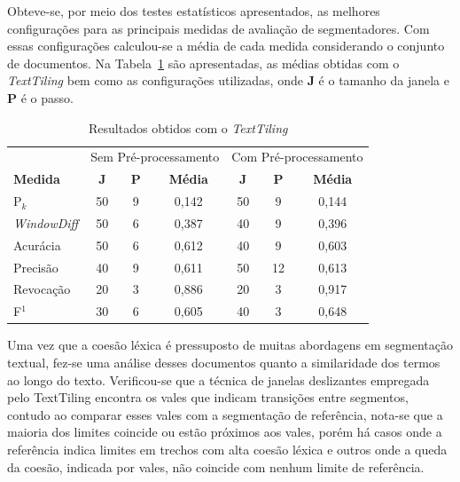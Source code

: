 Obteve-se, por meio dos testes estatísticos apresentados, as melhores configurações para as principais medidas de avaliação de segmentadores. Com essas configurações calculou-se a média de cada medida considerando o conjunto de documentos. Na Tabela~\ref{tab:resultadosTT} são apresentadas, as médias obtidas com o \textit{TextTiling} bem como as configurações utilizadas, onde \textbf{J} é o tamanho da janela e \textbf{P} é o passo.


\begin{table}[!h]
	\centering
	\begin{tabular}{|l||c|c|c||c|c|c|} \hline

		& \multicolumn{3}{c||}{Sem Pré-processamento} 
		& \multicolumn{3}{c|}{Com Pré-processamento}\\			

		\textbf{Medida} & 
		\textbf{J} &
		\textbf{P} & 
		\textbf{Média} &
		\textbf{J} &
		\textbf{P} & 
		\textbf{Média} \\	\hline

		P$_k$				& 50 & 9 & 0,142 & 50 & 9  & 0,144 \\ \hline
		\textit{WindowDiff}	& 50 & 6 & 0,387 & 40 & 9  & 0,396 \\ \hline
		Acurácia			& 50 & 6 & 0,612 & 40 & 9  & 0,603 \\ \hline
		Precisão			& 40 & 9 & 0,611 & 50 & 12 & 0,613 \\ \hline
		Revocação			& 20 & 3 & 0,886 & 20 & 3  & 0,917 \\ \hline
		F$^1$				& 30 & 6 & 0,605 & 40 & 3  & 0,648 \\ \hline

	\end{tabular}
	\caption{Resultados obtidos com o \textit{TextTiling}}
	\label{tab:resultadosTT}
\end{table}






Uma vez que a coesão léxica é pressuposto de muitas abordagens em segmentação textual, fez-se uma análise desses documentos quanto a similaridade dos termos ao longo do texto. Verificou-se que a técnica de janelas deslizantes empregada pelo TextTiling encontra os vales que indicam transições entre segmentos, contudo ao comparar esses vales com a segmentação de referência, nota-se que a maioria dos limites coincide  ou estão próximos aos vales, porém há casos onde a referência indica limites em trechos com alta coesão léxica e outros onde a queda da coesão, indicada por vales, não coincide com nenhum limite de referência. 




